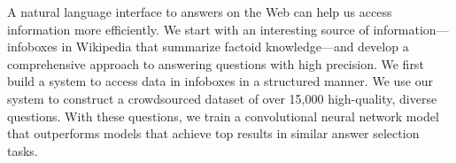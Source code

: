 A natural language interface to answers on the Web can help us access information more efficiently. We start with an interesting source of information—infoboxes in Wikipedia that summarize factoid knowledge—and develop a comprehensive approach to answering questions with high precision. We first build a system to access data in infoboxes in a structured manner. We use our system to construct a crowdsourced dataset of over 15,000 high-quality, diverse questions. With these questions, we train a convolutional neural network model that outperforms models that achieve top results in similar answer selection tasks.
